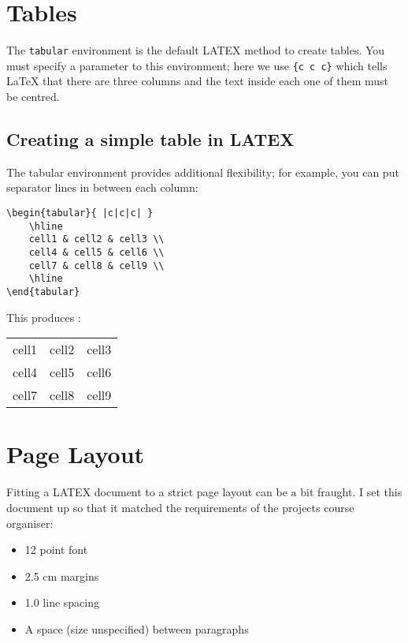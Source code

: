 \section{Tables}

The \verb|tabular| environment is the default LATEX method to create tables. You must specify a parameter to this environment; here we use \verb|{c c c}| which tells LaTeX that there are three columns and the text inside each one of them must be centred.

\subsection{Creating a simple table in LATEX}

The tabular environment provides additional flexibility; for example, you can put separator lines in between each column:

\begin{lstlisting}
\begin{tabular}{ |c|c|c| } 
    \hline
    cell1 & cell2 & cell3 \\ 
    cell4 & cell5 & cell6 \\ 
    cell7 & cell8 & cell9 \\ 
    \hline
\end{tabular}
\end{lstlisting}

This produces :

\begin{tabular}{ |c|c|c| } 
    \hline
    cell1 & cell2 & cell3 \\ 
    cell4 & cell5 & cell6 \\ 
    cell7 & cell8 & cell9 \\ 
    \hline
\end{tabular}

\section{Page Layout}

Fitting a LATEX document to a strict page layout can be a bit fraught. I set this document up so that it matched the requirements of the projects course organiser:

\begin{itemize}
    \item 12 point font
    \item 2.5 cm margins
    \item 1.0 line spacing
    \item A space (size unspecified) between paragraphs
\end{itemize}

